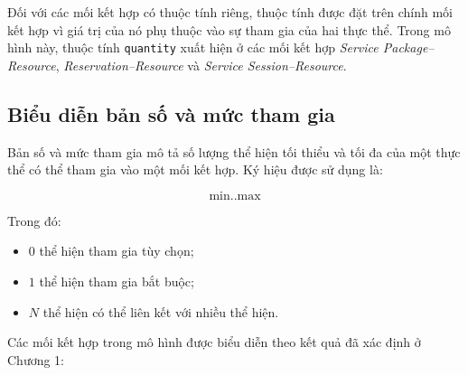 Đối với các mối kết hợp có thuộc tính riêng, thuộc tính được đặt trên chính mối kết hợp vì giá trị của nó phụ thuộc vào sự tham gia của hai thực thể. Trong mô hình này, thuộc tính \texttt{quantity} xuất hiện ở các mối kết hợp \textit{Service Package--Resource}, \textit{Reservation--Resource} và \textit{Service Session--Resource}.

\subsection{Biểu diễn bản số và mức tham gia}

Bản số và mức tham gia mô tả số lượng thể hiện tối thiểu và tối đa của một thực thể có thể tham gia vào một mối kết hợp. Ký hiệu được sử dụng là:

\[
\text{min..max}
\]

Trong đó:

\begin{itemize}
	\item $0$ thể hiện tham gia tùy chọn;
	\item $1$ thể hiện tham gia bắt buộc;
	\item $N$ thể hiện có thể liên kết với nhiều thể hiện.
\end{itemize}

Các mối kết hợp trong mô hình được biểu diễn theo kết quả đã xác định ở Chương 1:

